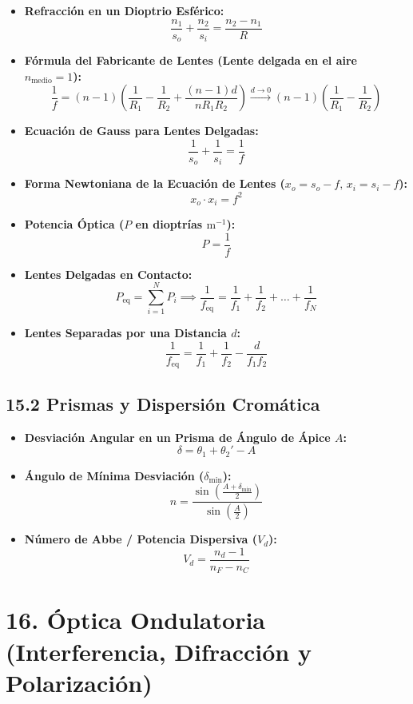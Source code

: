 \documentclass[11pt,a4paper]{article}
\begin{document}
\begin{itemize}
  \item \textbf{Refracción en un Dioptrio Esférico:}
  \[
    \frac{n_1}{s_o} + \frac{n_2}{s_i} = \frac{n_2 - n_1}{R}
  \]
  \item \textbf{Fórmula del Fabricante de Lentes (Lente delgada en el aire $n_{\text{medio}} = 1$):}
  \[
    \frac{1}{f} = (n - 1)\left( \frac{1}{R_1} - \frac{1}{R_2} + \frac{(n - 1)d}{n R_1 R_2} \right) \xrightarrow{d \to 0} (n - 1)\left( \frac{1}{R_1} - \frac{1}{R_2} \right)
  \]
  \item \textbf{Ecuación de Gauss para Lentes Delgadas:}
  \[
    \frac{1}{s_o} + \frac{1}{s_i} = \frac{1}{f}
  \]
  \item \textbf{Forma Newtoniana de la Ecuación de Lentes ($x_o = s_o - f, \, x_i = s_i - f$):}
  \[
    x_o \cdot x_i = f^2
  \]
  \item \textbf{Potencia Óptica ($P$ en dioptrías $\mathrm{m}^{-1}$):}
  \[
    P = \frac{1}{f}
  \]
  \item \textbf{Lentes Delgadas en Contacto:}
  \[
    P_{\mathrm{eq}} = \sum_{i=1}^N P_i \implies \frac{1}{f_{\mathrm{eq}}} = \frac{1}{f_1} + \frac{1}{f_2} + \dots + \frac{1}{f_N}
  \]
  \item \textbf{Lentes Separadas por una Distancia $d$:}
  \[
    \frac{1}{f_{\mathrm{eq}}} = \frac{1}{f_1} + \frac{1}{f_2} - \frac{d}{f_1 f_2}
  \]
\end{itemize}

\subsection*{15.2 Prismas y Dispersión Cromática}

\begin{itemize}
  \item \textbf{Desviación Angular en un Prisma de Ángulo de Ápice $A$:}
  \[
    \delta = \theta_1 + \theta_2' - A
  \]
  \item \textbf{Ángulo de Mínima Desviación ($\delta_{\min}$):}
  \[
    n = \frac{\sin\left( \frac{A + \delta_{\min}}{2} \right)}{\sin\left( \frac{A}{2} \right)}
  \]
  \item \textbf{Número de Abbe / Potencia Dispersiva ($V_d$):}
  \[
    V_d = \frac{n_d - 1}{n_F - n_C}
  \]
\end{itemize}

\section*{16. Óptica Ondulatoria (Interferencia, Difracción y Polarización)}
\end{document}
